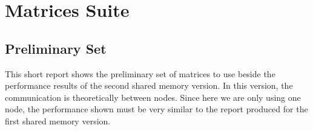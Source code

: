 \section{Matrices Suite} \label{matricesSuite}





\subsection*{Preliminary Set}
This short report shows the preliminary set of matrices to use beside the performance results of the second shared memory version. In this version, the communication is theoretically between nodes. Since here we are only using one node, the performance shown must be very similar to the report produced for the first shared memory version.

\medskip

